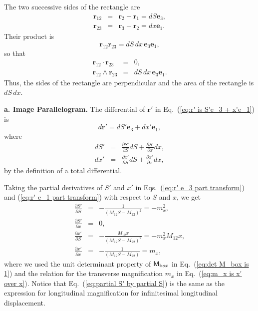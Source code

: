 \documentclass[11pt,twocolumn]{article}
\begin{document}
The two successive sides of the rectangle are
\begin{eqnarray}
\label{eq:r_12 is dS e_3}
\mathbf r_{12}&=&\mathbf r_2-\mathbf r_1=dS\mathbf e_3,\\
\label{eq:r_23 is dx e_1}
\mathbf r_{23}&=&\mathbf r_3-\mathbf r_2=dx\mathbf e_1.
\end{eqnarray}
Their product is
\begin{equation}
\label{eq:r_12 r_23 is dS dx e_3e_1}
\mathbf r_{12}\mathbf r_{23}=dS\,dx\,\mathbf e_3\mathbf e_1,
\end{equation}
so that
\begin{eqnarray}
\mathbf r_{12}\cdot \mathbf r_{23}&=&0,\\
\label{eq:dr_12 dr_23 bivector is dS dx e_3e_1}
\mathbf r_{12}\wedge \mathbf r_{23}&=&dS\,dx\,\mathbf e_3\mathbf e_1.
\end{eqnarray}
Thus, the sides of the rectangle are perpendicular and the area of the rectangle is $dS\,dx$.


\textbf{a.  Image Parallelogram.}  The differential of $\mathbf r'$ in Eq.~(\ref{eq:r' is S'e_3 + x'e_1}) is 
\begin{equation}
\label{eq:dr' is dS'e_3 + dx'e_1}
d\mathbf r'=dS'\mathbf e_3+dx'\mathbf e_1,
\end{equation}
where
\begin{eqnarray}
\label{eq:dS' total differential}
dS'&=&\frac{\partial S'}{\partial S}dS+\frac{\partial S'}{\partial x}dx,\\
\label{eq:dx' total differential}
dx'&=&\frac{\partial x'}{\partial S}dS+\frac{\partial x'}{\partial x}dx,
\end{eqnarray}
by the definition of a total differential.  

Taking the partial derivatives of $S'$ and $x'$ in Eqs.~(\ref{eq:r' e_3 part transform}) and (\ref{eq:r' e_1 part transform}) with respect to $S$ and $x$, we get
\begin{eqnarray}
\label{eq:partial S' by partial S}
\frac{\partial S'}{\partial S}&=&-\frac{1}{(M_{12}S-M_{22})^2}=-m_x^2,\\
\label{eq:partial S' by partial x}
\frac{\partial S'}{\partial x}&=&0,\\
\label{eq:partial x' by partial S}
\frac{\partial x'}{\partial S}&=&-\frac{M_{12}x}{(M_{12}S-M_{22})^2}=-m_x^2M_{12}x,\\
\label{eq:partial x' by partial x}
\frac{\partial x'}{\partial x}&=&-\frac{1}{(M_{12}S-M_{22})}=m_x,
\end{eqnarray}
where we used the unit determinant property of $\textsf M_{\textrm box}$ in Eq.~(\ref{eq:det M_box is 1}) and the relation for the transverse magnification $m_x$ in Eq.~(\ref{eq:m_x is x' over x}).  Notice that Eq.~(\ref{eq:partial S' by partial S}) is the same as the expression for longitudinal magnification for infinitesimal longitudinal displacement\cite{MouroulisMacDonald_1997_GeometricalOpticsandOpticalDesign_p58}.
\end{document}
